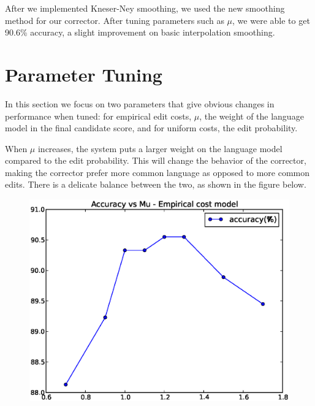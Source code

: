 \documentclass[10pt,twocolumn]{article}
\begin{document}
After we implemented Kneser-Ney smoothing, we used the new smoothing method for our corrector. After tuning parameters such as $\mu$, we were able to get 90.6\% accuracy, a slight improvement on basic interpolation smoothing. 
\section{Parameter Tuning}
In this section we focus on two parameters that give obvious changes in performance when tuned: for empirical edit costs, $\mu$, the weight of the language model in the final candidate score, and for uniform costs, the edit probability.

When $\mu$ increases, the system puts a larger weight on the language model compared to the edit probability. This will change the behavior of the corrector, making the corrector prefer more common language as opposed to more common edits. There is a delicate balance between the two, as shown in the figure below.
\begin{figure}[H]
\includegraphics[width=0.9\linewidth]{mu}
\end{figure}
\end{document}
